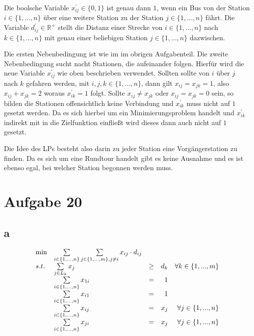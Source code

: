 \documentclass[10pt]{article}
\begin{document}
      Die boolsche Variable $x_{ij}^{\prime} \in \{0,1\}$ ist genau dann $1$,
      wenn ein Bus von der Station $i \in \{1,...,n\}$ über eine weitere Station 
      zu der Station $j\in \{1,...,n\}$ fährt. Die Variable $d_{ij}^{\prime} \in
      \mathbb{R}^{+}$ stellt die Distanz einer Strecke von $i \in \{1,...,n\}$
      nach $k\in\{1,...,n\}$ mit genau einer beliebigen Station $j\in
      \{1,...,n\}$ dazwischen. 

      Die ersten Nebenbedingung ist wie im im obrigen Aufgabenteil. Die zweite
      Nebenbedingung sucht nacht Stationen, die aufeinander folgen. Hierfür wird
      die neue Variable $x_{ij}^{\prime}$ wie oben beschrieben verwendet.
      Sollten sollte von $i$ über $j$ nach $k$ gefahren werden, mit
      $i,j,k\in\{1,...,n\}$, dann gilt $x_{ij}=x_{jk}=1$, also $x_{ij}+x_{jk}=2$
      woraus $x_{ik}^{\prime}=1$ folgt. Sollte $x_{ij} \neq x_{jk}$ oder
      $x_{ij}=x_{jk}=0$ sein, so bilden die Stationen offensichtlich keine
      Verbindung und $x_{ik}^{\prime}$ muss nicht auf $1$ gesetzt werden. Da es
      sich hierbei um ein Minimierungsproblem handelt und $x_{ik}^{\prime}$
      indirekt mit in die Zielfunktion einfließt wird dieses dann auch nicht auf
      $1$ gesetzt.

      Die Idee des LPs besteht also darin zu jeder Station eine Vorgängerstation
      zu finden. Da es sich um eine Rundtour handelt gibt es keine Ausnahme und
      es ist ebenso egal, bei welcher Station begonnen werden muss.

      
  \section*{Aufgabe 20}
    \subsection*{a}
      \begin{displaymath}
        \begin{array}{ l l c r r }
          \min & \sum\limits_{i\in\{1,...,n\}}\sum\limits_{j\in
                \{1,...,m\},j\neq i} x_{ij}\cdot d_{ij} & & & \\
          s.t. & \sum\limits_{j\in L_{k}} x_{j}& \geq & d_{k} & \forall k \in
                  \{1,...,m\}\\
               & \sum\limits_{i\in\{1,...,n\}} x_{1i} &=& 1 & \\
               & \sum\limits_{i\in\{1,...,n\}} x_{i1} &=& 1 & \\
               & \sum\limits_{i\in\{1,...,n\}} x_{ij} &=& x_{j} & \forall
                  j\in\{1,...,n\} \\
               & \sum\limits_{i\in\{1,...,n\}} x_{ji} &=& x_{j} & \forall
                  j\in\{1,...,n\} \\
        \end{array}
      \end{displaymath}
\end{document}
